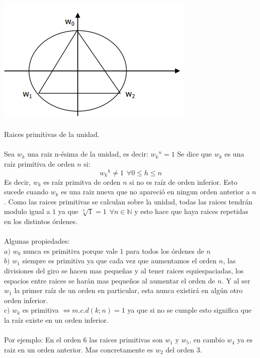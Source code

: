 \documentclass[]{article}
\begin{document}
\includegraphics{../../../Imagenes/Superior/Complejos/Complejos04.PNG}
\\
\\
\Large Raices primitivas de la unidad.
\normalsize
\\
\\
Sea $w_k$ una raiz n-ésima de la unidad, es decir: ${w_k}^{n} = 1$ Se dice que $w_k$ es una raíz primitiva de orden $n$ si:
$$
{w_k}^{h} \neq 1\hspace{5pt}\forall 0 \leq h \leq n
$$
Es decir, $w_k$ es raíz primitva de orden $n$ si no es raíz de orden inferior. Esto sucede cuando $w_k$ es una raiz nueva que no apareció en ningun orden anterior a $n$.
Como las raices primitivas se calculan sobre la unidad, todas las raices tendrán modulo igual a $1$ ya que $\sqrt[n]{1} = 1 \hspace{5pt} \forall n \in \mathbb{N}$ y esto hace que haya raices repetidas en los distintos órdenes.
\\
\\
Algunas propiedades:
\\
$a)$  $w_0$ nunca es primitiva porque vale $1$ para todos los órdenes de $n$\\
$b)$  $w_1$ siempre es primitiva ya que cada vez que aumentamos el orden $n$, las divisiones del giro se hacen mas pequeñas y al tener raices equiespaciadas, los espacios entre raices se harán mas pequeños al aumentar el orden de $n$. Y al ser $w_1$ la primer raíz de un orden en particular, esta nunca existirá en algún otro orden inferior.\\
$c)$  $w_k$ es primitiva $\Leftrightarrow m.c.d(k;n) = 1$ ya que si no se cumple esto significa que la raíz existe en un orden inferior.
\\
\\
Por ejemplo: En el orden $6$ las raices primitivas son $w_1$ y $w_5$, en cambio $w_4$ ya es raiz en un orden anterior. Mas concretamente es $w_2$ del orden $3$.
\\
\end{document}
